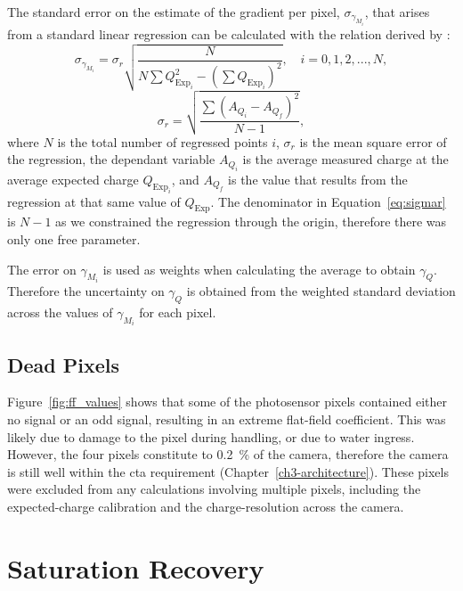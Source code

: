 The standard error on the estimate of the gradient per pixel, $\sigma_{\gamma_{M_i}}$, that arises from a standard linear regression can be calculated with the relation derived by \textcite{Taylor1997}:
\begin{equation} \label{eq:merr}
\sigma_{\gamma_{M_i}} = \sigma_r \sqrt{\frac{N}{N \sum Q_{\text{Exp}_i}^2 - (\sum Q_{\text{Exp}_i})^2}}, \quad i = 0, 1, 2, ..., N,
\end{equation}
\begin{equation} \label{eq:sigmar}
\sigma_r = \sqrt{\frac{\sum (A_{Q_i} - A_{Q_f})^2}{N - 1}},
\end{equation}
where $N$ is the total number of regressed points $i$, $\sigma_r$ is the mean square error of the regression, the dependant variable $A_{Q_i}$ is the average measured charge at the average expected charge $Q_{\text{Exp}_i}$, and $A_{Q_f}$ is the value that results from the regression at that same value of $Q_\text{Exp}$. The denominator in Equation~\ref{eq:sigmar} is $N-1$ as we constrained the regression through the origin, therefore there was only one free parameter.

The error on $\gamma_{M_i}$ is used as weights when calculating the average to obtain $\gamma_Q$. Therefore the uncertainty on $\gamma_Q$ is obtained from the weighted standard deviation across the values of $\gamma_{M_i}$ for each pixel.

\subsection{Dead Pixels}

Figure~\ref{fig:ff_values} shows that some of the photosensor pixels contained either no signal or an odd signal, resulting in an extreme flat-field coefficient. This was likely due to damage to the pixel during handling, or due to water ingress. However, the four pixels constitute to \SI{0.2}{\percent} of the camera, therefore the camera is still well within the  \gls{cta} requirement (Chapter~\ref{ch3-architecture}). These pixels were excluded from any calculations involving multiple pixels, including the expected-charge calibration and the charge-resolution across the camera. 

\section{Saturation Recovery}

